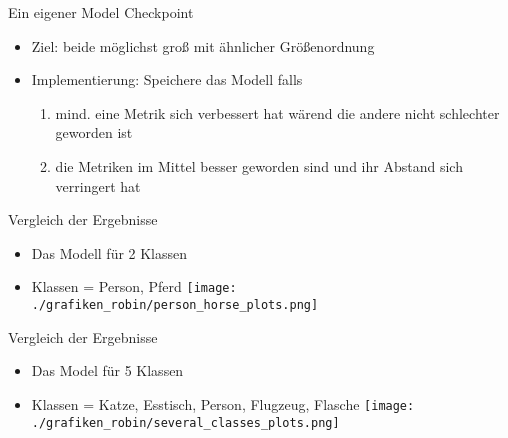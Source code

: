 \begin{frame}{Ein eigener Model Checkpoint}
\begin{itemize}
\item Ziel: beide möglichst groß mit ähnlicher Größenordnung
\item Implementierung: Speichere das Modell falls
\begin{enumerate}
\item mind. eine Metrik sich verbessert hat wärend die andere nicht schlechter geworden ist
\item die Metriken im Mittel besser geworden sind und ihr Abstand sich verringert hat
\end{enumerate}
\end{itemize}
\end{frame}

\begin{frame}{Vergleich der Ergebnisse}
\begin{itemize}
\item Das Modell für 2 Klassen
\item Klassen = Person, Pferd
\texttt{[image: ./grafiken\_robin/person\_horse\_plots.png]}
\end{itemize}
\end{frame}

\begin{frame}{Vergleich der Ergebnisse}
\begin{itemize}
\item Das Model für 5 Klassen
\item Klassen = Katze, Esstisch, Person, Flugzeug, Flasche
\texttt{[image: ./grafiken\_robin/several\_classes\_plots.png]}
\end{itemize}
\end{frame}

